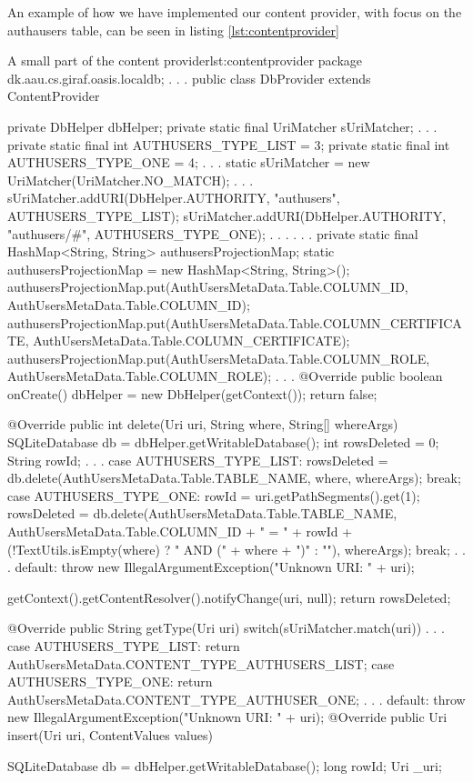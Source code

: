 An example of how we have implemented our content provider, with focus on the authausers table, can be seen in listing \vref{lst:contentprovider}

\begin{Java}{A small part of the content provider}{lst:contentprovider}
package dk.aau.cs.giraf.oasis.localdb;
.
.
.
public class DbProvider extends ContentProvider {

	private DbHelper dbHelper;
	private static final UriMatcher sUriMatcher;
	.
	.
	.
	private static final int AUTHUSERS_TYPE_LIST = 3;
	private static final int AUTHUSERS_TYPE_ONE = 4;
	.
	.
	.
	static {
		sUriMatcher = new UriMatcher(UriMatcher.NO_MATCH);
		.
		.
		.
		sUriMatcher.addURI(DbHelper.AUTHORITY, "authusers", AUTHUSERS_TYPE_LIST);
		sUriMatcher.addURI(DbHelper.AUTHORITY, "authusers/#", AUTHUSERS_TYPE_ONE);
		.
		.
		.
	}
	.
	.
	.
	private static final HashMap<String, String> authusersProjectionMap;
	static {
		authusersProjectionMap = new HashMap<String, String>();
		authusersProjectionMap.put(AuthUsersMetaData.Table.COLUMN_ID, AuthUsersMetaData.Table.COLUMN_ID);
		authusersProjectionMap.put(AuthUsersMetaData.Table.COLUMN_CERTIFICATE, AuthUsersMetaData.Table.COLUMN_CERTIFICATE);
		authusersProjectionMap.put(AuthUsersMetaData.Table.COLUMN_ROLE, AuthUsersMetaData.Table.COLUMN_ROLE);
	}
	.
	.
	.
	@Override
	public boolean onCreate() {
		dbHelper = new DbHelper(getContext());
		return false;
	}

	@Override
	public int delete(Uri uri, String where, String[] whereArgs) {
		SQLiteDatabase db = dbHelper.getWritableDatabase();
		int rowsDeleted = 0;
		String rowId;
		.
		.
		.
		case AUTHUSERS_TYPE_LIST:
			rowsDeleted = db.delete(AuthUsersMetaData.Table.TABLE_NAME, where, whereArgs);
			break;
		case AUTHUSERS_TYPE_ONE:
			rowId = uri.getPathSegments().get(1);
			rowsDeleted = db.delete(AuthUsersMetaData.Table.TABLE_NAME,
					AuthUsersMetaData.Table.COLUMN_ID + " = " + rowId + (!TextUtils.isEmpty(where) ? " AND (" + where + ")" : ""),
					whereArgs);
			break;
		.
		.
		.	
		default:
			throw new IllegalArgumentException("Unknown URI: " + uri);
		}

		getContext().getContentResolver().notifyChange(uri, null);
		return rowsDeleted;
	}

	@Override
	public String getType(Uri uri) {
		switch(sUriMatcher.match(uri)) {
		.
		.
		.
		case AUTHUSERS_TYPE_LIST:
			return AuthUsersMetaData.CONTENT_TYPE_AUTHUSERS_LIST;
		case AUTHUSERS_TYPE_ONE:
			return AuthUsersMetaData.CONTENT_TYPE_AUTHUSER_ONE;
		.
		.
		.
		default:
			throw new IllegalArgumentException("Unknown URI: " + uri);
		}
	}
	@Override
	public Uri insert(Uri uri, ContentValues values) {
		SQLiteDatabase db = dbHelper.getWritableDatabase();
		long rowId;
		Uri _uri;

}
\end{Java}
